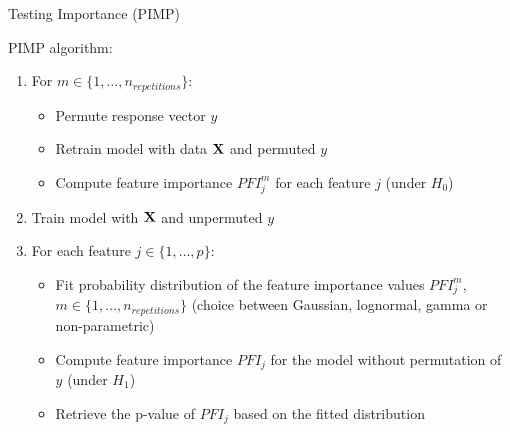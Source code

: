 \documentclass[11pt,compress,t,notes=noshow, aspectratio=169, xcolor=table]{beamer}
\begin{document}
\begin{frame}{Testing Importance (PIMP)}

PIMP algorithm:
\begin{enumerate}
	\item<1-3> For $m \in \{1, \ldots, n_{repetitions}\}$:
		\begin{itemize}
			\item Permute response vector $y$
			\item Retrain model with data $\Xmat$ and permuted $y$
			\item Compute feature importance $PFI_j^m$ for each feature $j$ (under $H_0$)
		\end{itemize}
	\item<2-3> Train model with $\Xmat$ and unpermuted $y$
	\item<3> For each feature $j \in \{1,\ldots,p\}$:
		\begin{itemize}
			\item Fit probability distribution of the feature importance values $PFI_j^m$, $m \in \{1, \ldots, n_{repetitions}\}$ (choice between Gaussian, lognormal, gamma or non-parametric)
			\item Compute feature importance $PFI_j$ for the model without permutation of $y$ (under $H_1$)
			\item Retrieve the p-value of $PFI_j$ based on the fitted distribution
		\end{itemize}
\end{enumerate}
\end{frame}
\end{document}
